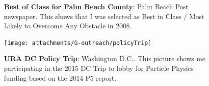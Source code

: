 \begin{figure}[h!]
	\centering
	\caption{\textbf{Best of Class for Palm Beach County}: Palm Beach Post newspaper. This shows that I was selected as Best in Class / Most Likely to Overcome Any Obstacle in 2008.}
	\hspace{1em}
\end{figure}

\begin{figure}[h!]
	\centering
	\caption{\textbf{URA DC Policy Trip}: Washington D.C.. This picture shows me participating in the 2015 DC Trip to lobby for Particle Physics funding based on the 2014 P5 report.}
	\texttt{[image: attachments/G-outreach/policyTrip]}
\end{figure}



